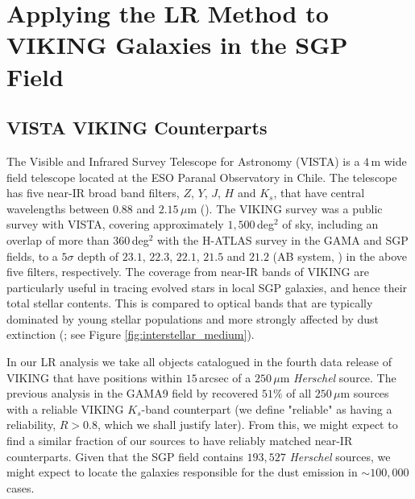 \section{Applying the LR Method to VIKING Galaxies in the SGP Field}
\subsection{VISTA VIKING Counterparts}
\label{sec:star_galaxy_classifier}

The Visible and Infrared Survey Telescope for Astronomy (VISTA) is a $4\,$m wide field telescope located at the ESO Paranal Observatory in Chile. The telescope has five near-IR broad band filters, $Z$, $Y$, $J$, $H$ and $K_s$, that have central wavelengths between $0.88$ and $2.15\,\mu$m (\citealt{Emerson_2010}). The VIKING survey was a public survey with VISTA, covering approximately $1,500\,$deg$^2$ of sky, including an overlap of more than $360\,$deg$^2$ with the H-ATLAS survey in the GAMA and SGP fields, to a $5\sigma$ depth of $23.1$, $22.3$, $22.1$, $21.5$ and $21.2$ (AB system, \citealt{Edge_2013}) in the above five filters, respectively. The coverage from near-IR bands of VIKING are particularly useful in tracing evolved stars in local SGP galaxies, and hence their total stellar contents. This is compared to optical bands that are typically dominated by young stellar populations and more strongly affected by dust extinction (\citealt{Cole_2001}; see Figure \ref{fig:interstellar_medium}).

In our LR analysis we take all objects catalogued in the fourth data release of VIKING that have positions within $15\,$arcsec of a $250\,\mu$m \textit{Herschel} source. The previous analysis in the GAMA9 field by \citealt{Fleuren_2012} recovered $51\%$ of all $250\,\mu$m sources with a reliable VIKING $K_s$-band counterpart (we define "reliable" as having a reliability, $R > 0.8$, which we shall justify later). From this, we might expect to find a similar fraction of our sources to have reliably matched near-IR counterparts. Given that the SGP field contains $193,527$ \textit{Herschel} sources, we might expect to locate the galaxies responsible for the dust emission in $\sim 100,000$ cases.

